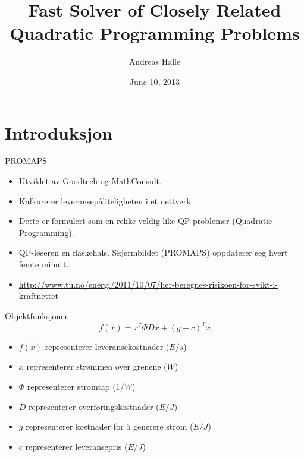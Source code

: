 \documentclass{beamer}
\title[Fast Solver of Closely Related Quadratic Programming Problems]
      {Fast Solver of Closely Related Quadratic Programming Problems}
\author{Andreas Halle}
\date{June 10, 2013}
\begin{document}
\begin{frame}
\titlepage
\end{frame}



\section{Introduksjon}



\begin{frame}{PROMAPS}
\begin{itemize}
\item Utviklet av Goodtech og MathConsult.
\item Kalkurerer leveransepåliteligheten i et nettverk
\item Dette er formulert som en rekke veldig like QP-problemer
      (Quadratic Programming).
\item QP-løseren en flaskehals. Skjermbildet (PROMAPS) oppdaterer seg hvert
      femte minutt.
\item \url{http://www.tu.no/energi/2011/10/07/her-beregnes-risikoen-for-svikt-i-kraftnettet}
\end{itemize}
\end{frame}






\begin{frame}{Objektfunksjonen}
\[
f(x) = x^T \Phi D x + (g - c)^T x
\]
\begin{itemize}
\item $f(x)$ representerer leveransekostnader ($E/s$)
\item $x$ representerer strømmen over grenene ($W$)
\item $\Phi$ representerer strømtap ($1/W$)
\item $D$ representerer overføringskostnader ($E/J$)
\item $g$ representerer kostnader for å generere strøm ($E/J$)
\item $c$ representerer leveransepris ($E/J$)
\end{itemize}
\end{frame}
\end{document}
